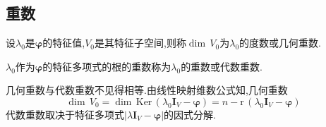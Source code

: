 \subsection{重数}
\begin{formal}
\begin{definition}[几何重数与代数重数]\label{def:几何重数与代数重数}
    设$\lambda_0$是$\bm{\varphi}$的特征值,$V_0$是其特征子空间,则称$\dim\,V_0$为$\lambda_0$的度数或几何重数.

    $\lambda_0$作为$\bm{\varphi}$的特征多项式的根的重数称为$\lambda_0$的重数或代数重数.
\end{definition}
\end{formal}
\begin{red}
\begin{remark}
    几何重数与代数重数不见得相等.由线性映射维数公式知,几何重数
    \[
    \dim\,V_0=\dim\,\mathrm{Ker}\,\left(
        \lambda_0\bm{I}_V-\bm{\varphi}
    \right)=n-\mathrm{r}\,\left(
        \lambda_0\bm{I}_V-\bm{\varphi}
    \right)
    \]
    代数重数取决于特征多项式$\left|
    \lambda\bm{I}_V-\bm{\varphi}
    \right|$的因式分解.
\end{remark}
\end{red}
